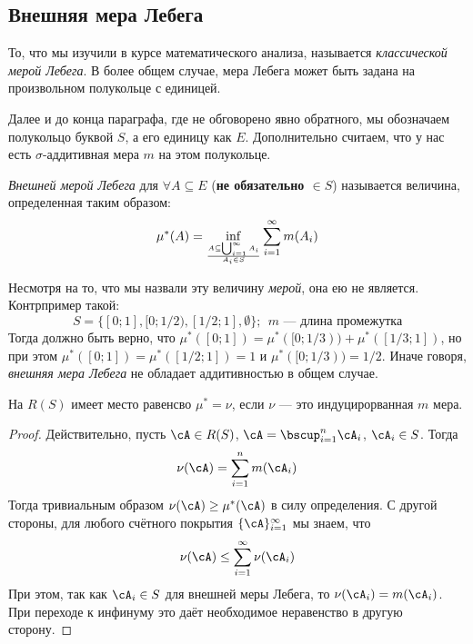 \subsection{Внешняя мера Лебега}

\begin{note}
	То, что мы изучили в курсе математического анализа, называется \textit{классической мерой Лебега}. В более общем случае, мера Лебега может быть задана на произвольном полукольце с единицей.
\end{note}

\begin{note}
	Далее и до конца параграфа, где не обговорено явно обратного, мы обозначаем полукольцо буквой $S$, а его единицу как $E$. Дополнительно считаем, что у нас есть $\sigma$-аддитивная мера $m$ на этом полукольце.
\end{note}

\begin{definition}
	\textit{Внешней мерой Лебега} для $\forall A \subseteq E$ (\textbf{не обязательно $\in S$}) называется величина, определенная таким образом:
	\[
		\mu^*(A) = \inf_{A \subseteq \bigcup_{i = 1}^\infty A_i \over A_i \in S} \sum_{i = 1}^\infty m(A_i)
	\]
\end{definition}

\begin{note}
	Несмотря на то, что мы назвали эту величину \textit{мерой}, она ею не является. Контрпример такой:
	\[
		S = \{[0; 1], [0; 1/2), [1/2; 1], \emptyset\};\ \ m \text{ --- длина промежутка}
	\]
	Тогда должно быть верно, что $\mu^*([0; 1]) = \mu^*([0; 1/3)) + \mu^*([1/3; 1])$, но при этом $\mu^*([0; 1]) = \mu^*([1/2; 1]) = 1$ и $\mu^*([0; 1/3)) = 1/2$. Иначе говоря, \textit{внешняя мера Лебега} не обладает аддитивностью в общем случае.
\end{note}

\begin{proposition}
	На $R(S)$ имеет место равенсво $\mu^* = \nu$, если $\nu$ --- это индуцирорванная $m$ мера.
\end{proposition}

\begin{proof}
	Действительно, пусть $\cA \in R(S)$, $\cA = \bscup_{i = 1}^n \cA_i$, $\cA_i \in S$. Тогда
	\[
		\nu(\cA) = \sum_{i = 1}^n m(\cA_i)
	\]
	Тогда тривиальным образом $\nu(\cA) \ge \mu^*(\cA)$ в силу определения. С другой стороны, для любого счётного покрытия $\{\cA\}_{i = 1}^\infty$ мы знаем, что
	\[
		\nu(\cA) \le \sum_{i = 1}^\infty \nu(\cA_i)
	\]
	При этом, так как $\cA_i \in S$ для внешней меры Лебега, то $\nu(\cA_i) = m(\cA_i)$. При переходе к инфинуму это даёт необходимое неравенство в другую сторону.
\end{proof}

